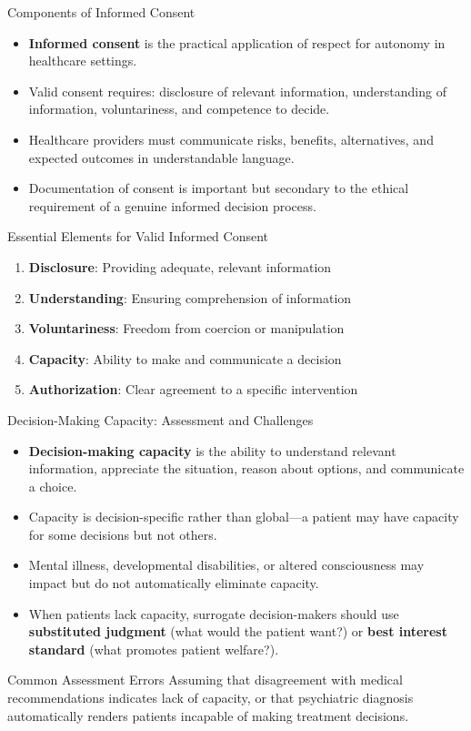 \documentclass{beamer}
\begin{document}
	\begin{frame}{Components of Informed Consent}
		\begin{itemize}
			\item \textbf{Informed consent} is the practical application of respect for autonomy in healthcare settings.
			\item Valid consent requires: disclosure of relevant information, understanding of information, voluntariness, and competence to decide.
			\item Healthcare providers must communicate risks, benefits, alternatives, and expected outcomes in understandable language.
			\item Documentation of consent is important but secondary to the ethical requirement of a genuine informed decision process.
		\end{itemize}
		
		\begin{block}{Essential Elements for Valid Informed Consent}
			\begin{enumerate}
				\item \textbf{Disclosure}: Providing adequate, relevant information
				\item \textbf{Understanding}: Ensuring comprehension of information
				\item \textbf{Voluntariness}: Freedom from coercion or manipulation
				\item \textbf{Capacity}: Ability to make and communicate a decision
				\item \textbf{Authorization}: Clear agreement to a specific intervention
			\end{enumerate}
		\end{block}
	\end{frame}
	
	\begin{frame}{Decision-Making Capacity: Assessment and Challenges}
		\begin{itemize}
			\item \textbf{Decision-making capacity} is the ability to understand relevant information, appreciate the situation, reason about options, and communicate a choice.
			\item Capacity is decision-specific rather than global—a patient may have capacity for some decisions but not others.
			\item Mental illness, developmental disabilities, or altered consciousness may impact but do not automatically eliminate capacity.
			\item When patients lack capacity, surrogate decision-makers should use \textbf{substituted judgment} (what would the patient want?) or \textbf{best interest standard} (what promotes patient welfare?).
		\end{itemize}
		
		\begin{alertblock}{Common Assessment Errors}
			Assuming that disagreement with medical recommendations indicates lack of capacity, or that psychiatric diagnosis automatically renders patients incapable of making treatment decisions.
		\end{alertblock}
	\end{frame}
	
\end{document}
